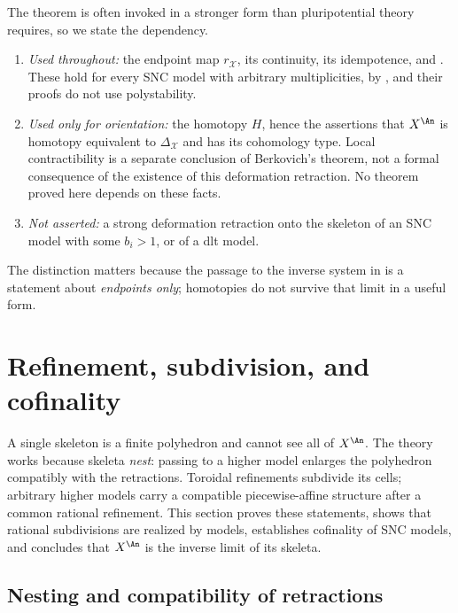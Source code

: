 \begin{remark}
\label{rem:deformation-scope}
The theorem is often invoked in a stronger form than pluripotential theory
requires, so we state the dependency.
\begin{enumerate}
\item \emph{Used throughout:} the endpoint map $r_{\mathcal X}$, its
  continuity, its idempotence, and . These
  hold for every SNC model with arbitrary multiplicities, by
  , and their proofs do not use
  polystability.
\item \emph{Used only for orientation:} the homotopy $H$, hence the
  assertions that $X^{\An}$ is homotopy equivalent to
  $\Delta_{\mathcal X}$ and has its cohomology type.  Local
  contractibility is a separate conclusion of Berkovich's theorem, not a
  formal consequence of the existence of this deformation retraction. No
  theorem proved here depends on these facts.
\item \emph{Not asserted:} a strong deformation retraction onto the skeleton
  of an SNC model with some $b_i>1$, or of a dlt model.
\end{enumerate}
The distinction matters because the passage to the inverse system in
 is a statement about \emph{endpoints
only}; homotopies do not survive that limit in a useful form.
\end{remark}

\section{Refinement, subdivision, and cofinality}
\label{sec:skeleton-refinement}

A single skeleton is a finite polyhedron and cannot see all of $X^{\An}$.
The theory works because skeleta \emph{nest}: passing to a higher model
enlarges the polyhedron compatibly with the retractions.  Toroidal
refinements subdivide its cells; arbitrary higher models carry a compatible
piecewise-affine structure after a common rational refinement. This section
proves these statements, shows that rational subdivisions are realized by
models, establishes cofinality of SNC models, and concludes that $X^{\An}$
is the inverse limit of its skeleta.

\subsection{Nesting and compatibility of retractions}

